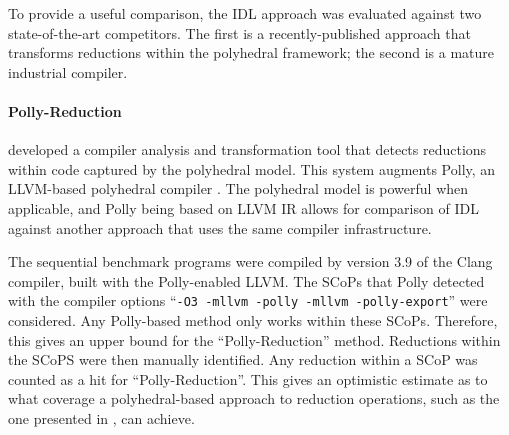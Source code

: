     To provide a useful comparison, the IDL approach was evaluated against two
    state-of-the-art competitors.
    The first is a recently-published approach that transforms reductions within
    the polyhedral framework; the second is a mature industrial compiler.

\paragraph*{Polly-Reduction}

    \citet{Doerfert2015Polly} developed a compiler analysis and transformation
    tool that detects reductions within code captured by the polyhedral model.
    This system augments Polly, an LLVM-based polyhedral compiler
    \citep{Lengauer2012Polly}.
    The polyhedral model is powerful when applicable, and Polly being based on
    LLVM IR allows for comparison of IDL against another approach that uses the
    same compiler infrastructure.

    The sequential benchmark programs were compiled by version 3.9 of the
    Clang compiler, built with the Polly-enabled LLVM.
    The SCoPs that Polly detected with the compiler options
    ``{\tt-O3 -mllvm -polly -mllvm -polly-export}'' were considered.
    Any Polly-based method only works within these SCoPs.
    Therefore, this gives an upper bound for the ``Polly-Reduction'' method.
    Reductions within the SCoPS were then manually identified.
    Any reduction within a SCoP was counted as a hit for ``Polly-Reduction''.
    This gives an optimistic estimate as to what coverage a polyhedral-based
    approach to reduction operations, such as the one presented in
    \citet{Doerfert2015Polly}, can achieve.

